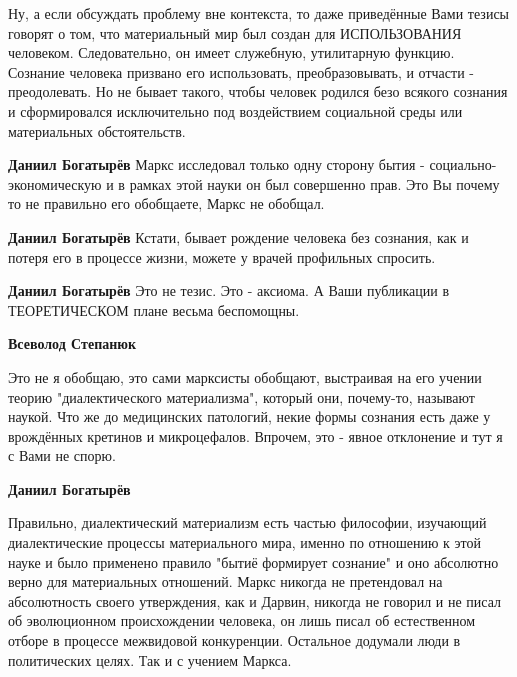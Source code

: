 \begin{itemize}
\begin{itemize}
Ну, а если обсуждать проблему вне контекста, то даже приведённые Вами тезисы
говорят о том, что материальный мир был создан для ИСПОЛЬЗОВАНИЯ человеком.
Следовательно, он имеет служебную, утилитарную функцию. Сознание человека
призвано его использовать, преобразовывать, и отчасти - преодолевать. Но не
бывает такого, чтобы человек родился безо всякого сознания и сформировался
исключительно под воздействием социальной среды или материальных обстоятельств.


\textbf{Даниил Богатырёв} Маркс исследовал только одну сторону бытия - социально-экономическую и в рамках этой науки он был совершенно прав. Это Вы почему то не правильно его обобщаете, Маркс не обобщал.

\textbf{Даниил Богатырёв} Кстати, бывает рождение человека без сознания, как и потеря его в процессе жизни, можете у врачей профильных спросить.

\textbf{Даниил Богатырёв} Это не тезис. Это - аксиома. А Ваши публикации в ТЕОРЕТИЧЕСКОМ плане весьма беспомощны.

\textbf{Всеволод Степанюк} 

Это не я обобщаю, это сами марксисты обобщают, выстраивая на его учении теорию
"диалектического материализма", который они, почему-то, называют наукой. Что же
до медицинских патологий, некие формы сознания есть даже у врождённых кретинов
и микроцефалов. Впрочем, это - явное отклонение и тут я с Вами не спорю.

\textbf{Даниил Богатырёв} 

Правильно, диалектический материализм есть частью философии, изучающий
диалектические процессы материального мира, именно по отношению к этой науке и
было применено правило "бытиё формирует сознание" и оно абсолютно верно для
материальных отношений. Маркс никогда не претендовал на абсолютность своего
утверждения, как и Дарвин, никогда не говорил и не писал об эволюционном
происхождении человека, он лишь писал об естественном отборе в процессе
межвидовой конкуренции. Остальное додумали люди в политических целях. Так и с
учением Маркса.

\end{itemize} %

\end{itemize} %
